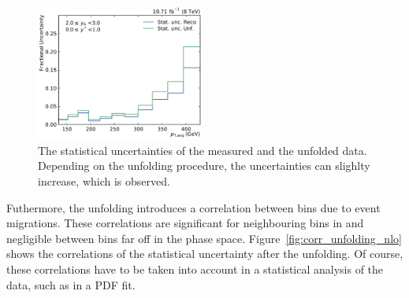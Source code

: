 \begin{figure}[htbp]
    \includegraphics[width=0.49\textwidth]{figures/measurement/statunc_fractional_yb2ys0.pdf}
    \caption[Statistical uncertainty of measured and unfolded sprectrum]{The
    statistical uncertainties of the measured and the unfolded data. Depending
    on the unfolding procedure, the uncertainties can slighlty increase, which
    is observed.}
    \label{fig:statunc_relative}
\end{figure}

Futhermore, the unfolding introduces a correlation between bins due to event
migrations. These correlations are significant for neighbouring bins in \pt and
negligible between bins far off in the phase space.
Figure~\ref{fig:corr_unfolding_nlo} shows the correlations of the statistical
uncertainty after the unfolding. Of course, these correlations have to be taken
into account in a statistical analysis of the data, such as in a PDF fit.

